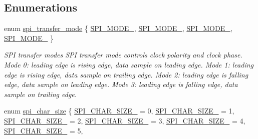 \subsection*{Enumerations}
\begin{DoxyCompactItemize}
\item 
enum \hyperlink{group__hpl__spi_ga9c30fdfffba6be76b4044ccb17b218e5}{spi\+\_\+transfer\+\_\+mode} \{ \hyperlink{group__hpl__spi_gga9c30fdfffba6be76b4044ccb17b218e5a152359b11fb4b43ed0c5485eb0ab0673}{S\+P\+I\+\_\+\+M\+O\+D\+E\+\_}, 
\hyperlink{group__hpl__spi_gga9c30fdfffba6be76b4044ccb17b218e5a7c1990cc15e9d69621be8e0e757e634c}{S\+P\+I\+\_\+\+M\+O\+D\+E\+\_}, 
\hyperlink{group__hpl__spi_gga9c30fdfffba6be76b4044ccb17b218e5a4d350945d895a4acdc45ae96b0b82fc3}{S\+P\+I\+\_\+\+M\+O\+D\+E\+\_}, 
\hyperlink{group__hpl__spi_gga9c30fdfffba6be76b4044ccb17b218e5af06ec36087996d6f328df39866ff5de6}{S\+P\+I\+\_\+\+M\+O\+D\+E\+\_}
 \}\begin{DoxyCompactList}\small\item\em S\+PI transfer modes S\+PI transfer mode controls clock polarity and clock phase. Mode 0\+: leading edge is rising edge, data sample on leading edge. Mode 1\+: leading edge is rising edge, data sample on trailing edge. Mode 2\+: leading edge is falling edge, data sample on leading edge. Mode 3\+: leading edge is falling edge, data sample on trailing edge. \end{DoxyCompactList}
\item 
enum \hyperlink{group__hpl__spi_ga4a3ef460c2cea333834811806f32d60a}{spi\+\_\+char\+\_\+size} \{ \newline
\hyperlink{group__hpl__spi_gga4a3ef460c2cea333834811806f32d60aa545c4eeac3fb7aeaeeb2ad03846f2229}{S\+P\+I\+\_\+\+C\+H\+A\+R\+\_\+\+S\+I\+Z\+E\+\_} = 0, 
\hyperlink{group__hpl__spi_gga4a3ef460c2cea333834811806f32d60aa811e552b89c9b9c3e6a8651132c51a0a}{S\+P\+I\+\_\+\+C\+H\+A\+R\+\_\+\+S\+I\+Z\+E\+\_} = 1, 
\hyperlink{group__hpl__spi_gga4a3ef460c2cea333834811806f32d60aa9d1f60998e243ba7e89e000729f094c6}{S\+P\+I\+\_\+\+C\+H\+A\+R\+\_\+\+S\+I\+Z\+E\+\_} = 2, 
\hyperlink{group__hpl__spi_gga4a3ef460c2cea333834811806f32d60aa44e024c8e69dde6a399893ab546f143f}{S\+P\+I\+\_\+\+C\+H\+A\+R\+\_\+\+S\+I\+Z\+E\+\_} = 3, 
\newline
\hyperlink{group__hpl__spi_gga4a3ef460c2cea333834811806f32d60aa1173f1bd9d748952aee7a529f29db7ae}{S\+P\+I\+\_\+\+C\+H\+A\+R\+\_\+\+S\+I\+Z\+E\+\_} = 4, 
\hyperlink{group__hpl__spi_gga4a3ef460c2cea333834811806f32d60aae4bfe6a81d35bb32649c29ef61ed0149}{S\+P\+I\+\_\+\+C\+H\+A\+R\+\_\+\+S\+I\+Z\+E\+\_} = 5, 

\end{DoxyCompactItemize}
